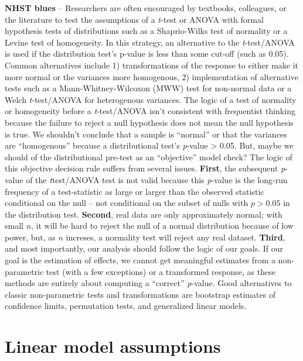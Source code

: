 \documentclass[]{book}
\begin{document}
\textbf{NHST blues} -- Researchers are often encouraged by textbooks, colleagues, or the literature to test the assumptions of a \emph{t}-test or ANOVA with formal hypothesis tests of distributions such as a Shaprio-Wilks test of normality or a Levine test of homogeneity. In this strategy, an alternative to the \emph{t}-test/ANOVA is used if the distribution test's p-value is less than some cut-off (such as 0.05). Common alternatives include 1) transformations of the response to either make it more normal or the variances more homogenous, 2) implementation of alternative tests such as a Mann-Whitney-Wilcoxon (MWW) test for non-normal data or a Welch \emph{t}-test/ANOVA for heterogenous variances. The logic of a test of normality or homogeneity before a \emph{t}-test/ANOVA isn't consistent with frequentist thinking because the failure to reject a null hypothesis does not mean the null hypothesis is true. We shouldn't conclude that a sample is ``normal'' or that the variances are ``homogenous'' because a distributional test's \emph{p}-value \textgreater{} 0.05. But, maybe we should of the distributional pre-test as an ``objective'' model check? The logic of this objective decision rule suffers from several issues. \textbf{First}, the subsequent \emph{p}-value of the \emph{t}test/ANOVA test is not valid because this \emph{p}-value is the long-run frequency of a test-statistic as large or larger than the observed statistic conditional on the null -- not conditional on the subset of nulls with \(p > 0.05\) in the distribution test. \textbf{Second}, real data are only approximately normal; with small \(n\), it will be hard to reject the null of a normal distribution because of low power, but, as \(n\) increses, a normality test will reject any real dataset. \textbf{Third}, and most importantly, our analysis should follow the logic of our goals. If our goal is the estimation of effects, we cannot get meaningful estimates from a non-parametric test (with a few exceptions) or a transformed response, as these methods are entirely about computing a ``correct'' \emph{p}-value. Good alternatives to classic non-parametric tests and transformations are bootstrap estimates of confidence limits, permutation tests, and generalized linear models.

\hypertarget{linear-model-assumptions}{%
\section{Linear model assumptions}\label{linear-model-assumptions}}
\end{document}
